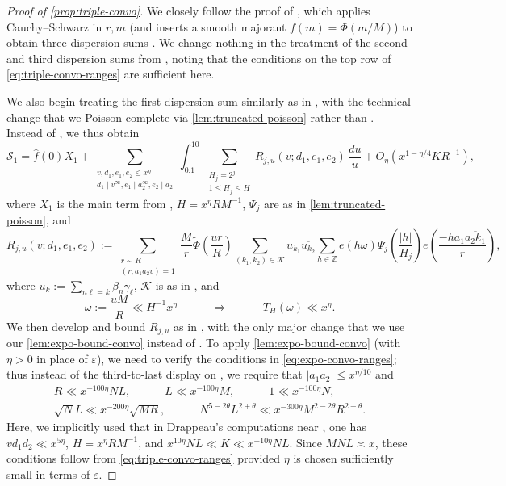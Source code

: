 \documentclass[reqno,11pt]{amsart}
\theoremstyle{remark}
\numberwithin{equation}{section}
\newcommand{\Z}{\mathbb{Z}}
\newcommand{\mK}{\mathcal{K}}
\newcommand{\mS}{\mathcal{S}}
\newcommand{\eps}{\varepsilon}
\renewcommand{\bar}{\overline}
\renewcommand{\hat}{\widehat}
\renewcommand{\tilde}{\widetilde}
\begin{document}
\begin{proof}[Proof of \cref{prop:triple-convo}]
We closely follow the proof of \cite[Th\'ero\`eme 3]{drappeau2015theoremes}, which applies Cauchy--Schwarz in $r, m$ (and inserts a smooth majorant $f(m) = \Phi(m/M)$) to obtain three dispersion sums \cite[Section 3.1]{drappeau2015theoremes}. We change nothing in the treatment of the second and third dispersion sums from \cite[Sections 3.2, 3.3]{drappeau2015theoremes}, noting that the conditions on the top row of \cref{eq:triple-convo-ranges} are sufficient here.

We also begin treating the first dispersion sum similarly as in \cite[Section 3.4]{drappeau2015theoremes}, with the technical change that we Poisson complete via \cref{lem:truncated-poisson} rather than \cite[Lemme 2]{drappeau2015theoremes}. Instead of \cite[(3.12)]{drappeau2015theoremes}, we thus obtain
\[
    \mS_1 = \hat{f}(0)X_1 + \sum_{\substack{v, d_1,e_1,e_2 \le x^\eta \\ d_1 \mid v^\infty, e_1 \mid a_2^\infty, e_2 \mid a_2}} \int_{0.1}^{10} \sum_{\substack{H_j = 2^j \\ 1 \le H_j \le H}} R_{j,u}(v; d_1, e_1, e_2)\, \frac{du}{u} + O_\eta(x^{1-\eta/4} K R^{-1}),
\]
where $X_1$ is the main term from \cite[(3.12)]{drappeau2015theoremes}, $H = x^\eta R M^{-1}$, $\Psi_j$ are as in \cref{lem:truncated-poisson}, and
\[
    R_{j,u}(v; d_1, e_1, e_2) := \sum_{\substack{r \sim R \\ (r, a_1a_2v) = 1}} \frac{M}{r} \tilde\Phi\left(\frac{ur}{R}\right) \sum_{(k_1, k_2) \in \mK} u_{k_1} \bar{u_{k_2}} \sum_{h \in \Z} e\left(h\omega\right) \Psi_j\left(\frac{|h|}{H_j}\right) e\left(\frac{-ha_1\bar{a_2k_1}}{r}\right),
\]
where $u_k := \sum_{n\ell = k} \beta_n \gamma_\ell$, $\mK$ is as in \cite[p.\,841]{drappeau2015theoremes}, and
\[
    \omega := \frac{uM}{R} \ll H^{-1} x^\eta
    \qquad\quad 
    \Rightarrow 
    \qquad\quad 
    T_H(\omega) \ll x^\eta.
\]
We then develop and bound $R_{j,u}$ as in \cite[p.\,843]{drappeau2015theoremes}, with the only major change that we use our \cref{lem:expo-bound-convo} instead of \cite[Proposition 1]{drappeau2015theoremes}. To apply \cref{lem:expo-bound-convo} (with $\eta > 0$ in place of $\eps$), we need to verify the conditions in \cref{eq:expo-convo-ranges}; thus instead of the third-to-last display on \cite[p.\,843]{drappeau2015theoremes}, we require that $|a_1 a_2| \le x^{\eta/10}$ and
\[
\begin{gathered}    
    R \ll x^{-100\eta} NL, \qquad\quad 
    L \ll x^{-100\eta} M, \qquad\quad 
    1 \ll x^{-100\eta} N,
    \\
    \sqrt{N} L \ll x^{-200\eta} \sqrt{M R}, \qquad\quad 
    N^{5-2\theta} L^{2+\theta} \ll x^{-300\eta} M^{2-2\theta} R^{2+\theta}.
\end{gathered}
\]
Here, we implicitly used that in Drappeau's computations near \cite[bottom of p.\,843]{drappeau2015theoremes}, one has $vd_1d_2 \ll x^{5\eta}$, $H = x^\eta R M^{-1}$, and $x^{10\eta} NL \ll K \ll x^{-10\eta} NL$. Since $MNL \asymp x$, these conditions follow from \cref{eq:triple-convo-ranges} provided $\eta$ is chosen sufficiently small in terms of $\eps$.
\end{proof}
\end{document}
